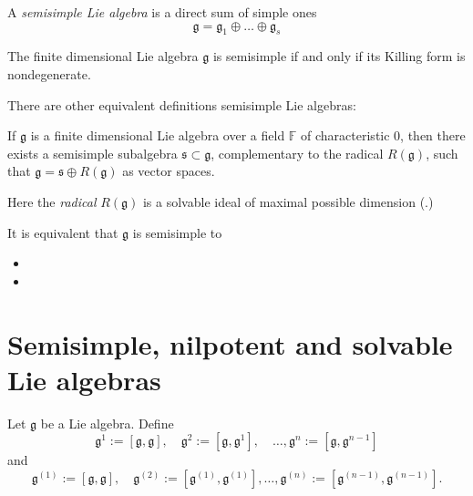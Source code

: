 \begin{definition}
\label{definition-semisimple-Lie-algebra}
A {\it semisimple Lie algebra}
is a direct sum of simple ones
$$
\mathfrak{g}=\mathfrak{g}
_1\oplus\ldots\oplus\mathfrak{g}_s
$$
\end{definition}

\begin{theorem}[Cartan]
\label{theorem-cartan-semisimple}
The finite dimensional Lie algebra
$\mathfrak{g}$ is semisimple if and only if
its Killing form is nondegenerate.
\end{theorem}

\noindent
There are other equivalent definitions
semisimple Lie algebras:

\begin{theorem}
\label{theorem-levi-decomposition}
\begin{reference}
\cite[Theorem 11.1]{KLAL}
\end{reference}
If $\mathfrak{g}$ is a finite dimensional Lie
algebra
over a field $\mathbb{F}$ of characteristic
0,
then there exists a semisimple subalgebra
$\mathfrak{s}\subset\mathfrak{g}$,
complementary
to the radical $R(\mathfrak{g})$,
such that $\mathfrak{g}=\mathfrak{s} \oplus
R(\mathfrak{g})$
as vector spaces.
\end{theorem}

Here the {\it radical} $R(\mathfrak{g})$
is a solvable ideal of maximal possible
dimension
(\cite[Definition 11.1]{KLAL}.)

It is equivalent that $\mathfrak{g}$ is
semisimple to

\begin{itemize}
\item

\item
\end{itemize}

\section{Semisimple, nilpotent and solvable
Lie algebras}
\label{section-nilpo-solva-lie-algeb}

Let $\mathfrak{g}$ be a Lie algebra. Define
$$
\mathfrak{g}^1:=[\mathfrak{g},\mathfrak{g}],
\quad
\mathfrak{g}^2:=[\mathfrak{g},\mathfrak{g}^1]
,\quad
\ldots,
\mathfrak{g}^n:=[\mathfrak{g},\mathfrak{g}
^{n-1}]
$$
and
$$
\mathfrak{g}^{(1)}:=[\mathfrak{g},
\mathfrak{g}],\quad
\mathfrak{g}^{(2)}:=[\mathfrak{g}^{(1)},
\mathfrak{g}^{(1)}],
\ldots,
\mathfrak{g}^{(n)}:=[\mathfrak{g}^{(n-1)},
\mathfrak{g}^{(n-1)}].
$$

